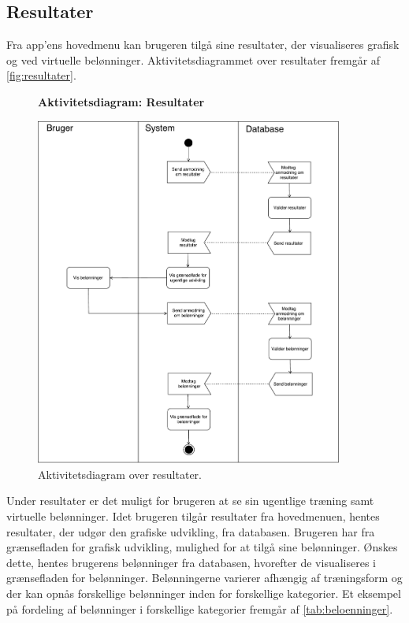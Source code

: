\subsection*{Resultater}
Fra app'ens hovedmenu kan brugeren tilgå sine resultater, der visualiseres grafisk og ved virtuelle belønninger.
Aktivitetsdiagrammet over resultater fremgår af \autoref{fig:resultater}.

\begin{figure} [H]
\centering
\textbf{Aktivitetsdiagram: Resultater}\par\medskip
\includegraphics[width=0.9\textwidth]{figures/aktivitetsdiagram/Resultater}
\caption{Aktivitetsdiagram over resultater.}
\label{fig:resultater}
\end{figure}

\noindent
Under resultater er det muligt for brugeren at se sin ugentlige træning samt virtuelle belønninger. Idet brugeren tilgår resultater fra hovedmenuen, hentes resultater, der udgør den grafiske udvikling, fra databasen. Brugeren har fra grænsefladen for grafisk udvikling, mulighed for at tilgå sine belønninger. Ønskes dette, hentes brugerens belønninger fra databasen, hvorefter de visualiseres i grænsefladen for belønninger. Belønningerne varierer afhængig af træningsform og der kan opnås forskellige belønninger inden for forskellige kategorier. Et eksempel på fordeling af belønninger i forskellige kategorier fremgår af \autoref{tab:beloenninger}.


